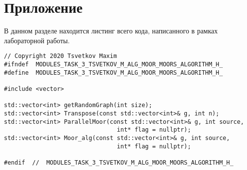 \documentclass{report}
\begin{document}
\section*{Приложение}
В данном разделе находится листинг всего кода, написанного в рамках лабораторной работы.
\begin{lstlisting}
// Copyright 2020 Tsvetkov Maxim
#ifndef  MODULES_TASK_3_TSVETKOV_M_ALG_MOOR_MOORS_ALGORITHM_H_
#define  MODULES_TASK_3_TSVETKOV_M_ALG_MOOR_MOORS_ALGORITHM_H_

#include <vector>

std::vector<int> getRandomGraph(int size);
std::vector<int> Transpose(const std::vector<int>& g, int n);
std::vector<int> ParallelMoor(const std::vector<int>& g, int source,
                                int* flag = nullptr);
std::vector<int> Moor_alg(const std::vector<int>& g, int source,
                                int* flag = nullptr);

#endif  //  MODULES_TASK_3_TSVETKOV_M_ALG_MOOR_MOORS_ALGORITHM_H_

\end{lstlisting}
\newpage
\end{document}
